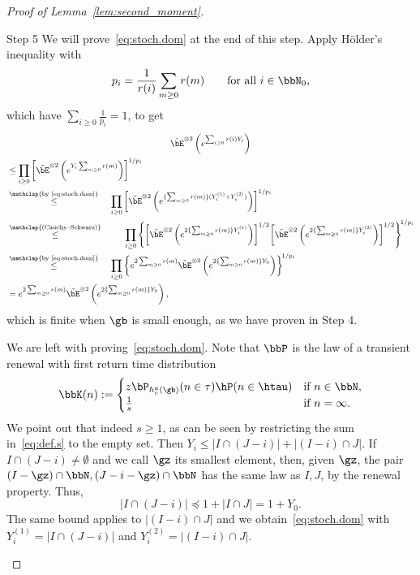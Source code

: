 \begin{proof}[Proof of Lemma~\ref{lem:second_moment}]
\begin{step}{Step 5}
We will prove~\eqref{eq:stoch.dom} at the end of this step. Apply H\"older's inequality with
\begin{equation}
p_i = \frac{1}{r(i)}\sum_{m\geq0} r(m) \qquad \text{for all } i\in \bbN_0,
\end{equation}
which have $\sum_{i\geq0} \frac{1}{p_i} = 1$, to get
\begin{multline*}
\tilde\bE^{\otimes 2} \left(e^{\sum_{i \geq 0} r(i) Y_i} \right)\\
\begin{aligned}
&\leq \prod_{i\geq 0} \left[\tilde\bE^{\otimes 2} \left(e^{Y_i\sum_{m \geq 0} r(m)} \right) \right]^{1/p_i}\\
&\stackrel{\mathclap{\text{by~\eqref{eq:stoch.dom}}}}{\leq}\quad\, \prod_{i\geq 0} \left[\tilde\bE^{\otimes 2} \left(e^{\{\sum_{m \geq 0} r(m)\}({ Y_i^{(1)}+Y_i^{(2)}})} \right) \right]^{1/p_i}\\
&\stackrel{\mathclap{\text{(Cauchy--Schwarz)}}}{\leq}\qquad\;\: \prod_{i\geq 0} \left\{ \left[\tilde\bE^{\otimes 2} \left(e^{2\{\sum_{m \geq 0} r(m)\}Y_i^{(1)}}\right) \right]^{1/2} \mskip -2mu \left[\tilde\bE^{\otimes 2} \left(e^{2\{\sum_{m \geq 0} r(m)\}Y_i^{(2)}} \right)\right]^{1/2} \right\}^{\! 1/p_i}\\
&\stackrel{\mathclap{\text{by~\eqref{eq:stoch.dom}}}}{\leq}\quad\, \prod_{i\geq 0} \left\{ e^{2\sum_{m\geq 0}r(m)} \tilde\bE^{\otimes 2} \left(e^{2\{\sum_{m \geq 0} r(m)\}Y_0} \right) \right\}^{\! 1/p_i} \\
& = e^{2\sum_{m\geq 0}r(m)} \tilde\bE^{\otimes 2} \left(e^{2\{\sum_{m \geq 0} r(m)\}Y_0} \right),
\end{aligned}
\end{multline*}
which is finite when $\gb$ is small enough, as we have proven in Step 4.

We are left with proving~\eqref{eq:stoch.dom}. Note that $\bbP$ is the law of a transient renewal with first return time distribution
\begin{equation}
\bbK(n):=
\begin{cases} z \bP_{h_c^a(\gb)}(n\in \tau) \hP (n\in \htau) & \text{if } n\in \bbN,\\ \frac{1}{s} & \text{if } n=\infty.
\end{cases}
\end{equation}
We point out that indeed $s\geq1$, as can be seen by restricting the sum in~\eqref{eq:def.s} to the empty set. Then $Y_i\le |I\cap (J-i)|+|(I-i)\cap J|$. If $I\cap (J-i)\ne \emptyset$ and we call $\gz$ its smallest element, then, given $\gz$, the pair $(I-\gz)\cap \bbN, (J-i-\gz)\cap \bbN$ has the same law as $I, J$, by the renewal property. Thus,
\begin{equation}
|I\cap (J-i)|\preceq 1+|I \cap J|=1+Y_0.
\end{equation}
The same bound applies to $|(I-i)\cap J|$ and we obtain~\eqref{eq:stoch.dom} with $Y_i^{(1)}=|I\cap (J-i)|$ and $Y_i^{(2)}=|(I-i)\cap J|$.
\end{step}


\end{proof}
